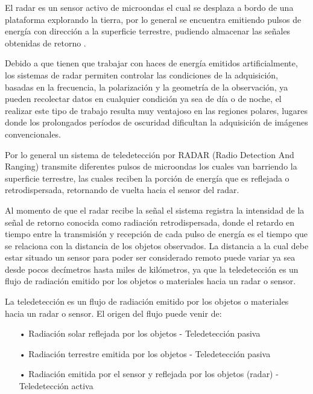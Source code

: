 El radar es un sensor activo de microondas el cual se desplaza a bordo de una plataforma explorando la tierra, por lo general se encuentra emitiendo pulsos de energía con dirección a la superficie terrestre, pudiendo almacenar las señales obtenidas de retorno \cite{Marchionni2014}. 

Debido a que tienen que trabajar con haces de energía emitidos artificialmente, los sistemas de radar permiten controlar las condiciones de la adquisición, basadas en la frecuencia, la polarización y la geometría de la observación, ya pueden recolectar datos en cualquier condición ya sea de día o de noche, el realizar este tipo de trabajo resulta muy ventajoso en las regiones polares, lugares donde los prolongados períodos de oscuridad dificultan la adquisición de imágenes convencionales. 

Por lo general un sistema de teledetección por RADAR (Radio Detection And Ranging) transmite diferentes pulsos de microondas los cuales van barriendo la superficie terrestre, las cuales reciben la porción de energía que es reflejada o retrodispersada, retornando de vuelta hacia el sensor del radar.

Al momento de que el radar recibe la señal el sistema registra la intensidad de la señal de retorno conocida como radiación retrodispersada, donde el retardo en tiempo entre la transmisión y recepción de cada pulso de energía es el tiempo que se relaciona con la distancia de los objetos observados.
La distancia a la cual debe estar situado un sensor para poder ser considerado remoto puede variar ya sea desde pocos decímetros hasta miles de kilómetros, ya que la teledetección es un flujo de radiación emitido por los objetos o materiales hacia un radar o sensor. 

La teledetección es un flujo de radiación emitido por los objetos o materiales hacia un radar o sensor. El origen del flujo puede venir de:

\begin{itemize}
\item[•] Radiación solar reflejada por los objetos - Teledetección pasiva
\item[•] Radiación terrestre emitida por los objetos - Teledetección pasiva
\item[•] Radiación emitida por el sensor y reflejada por los objetos (radar) - Teledetección activa
\end{itemize}

